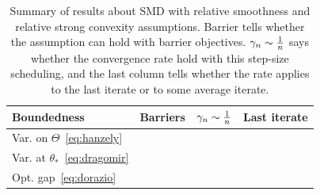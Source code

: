 \documentclass[twoside]{article}
\newcommand*{\expect}[2][]{\ensuremath{\mathbb{E}_{#1} \left[ #2 \right] }} %
\newcommand{\m}{\mu}
\newcommand{\lr}{\gamma} %
\begin{document}
\begin{table}[t]
\begingroup
\newcommand*{\greencmark}{\textcolor{Green}{\cmark}}
\newcommand*{\redxmark}{\textcolor{Red}{\xmark}}
\centering
\begin{tabular}{lccc}
\toprule
Boundedness & Barriers &  $\lr_n \sim \inv{n}$ & Last iterate \\
\midrule
Var. on $\Theta$~\eqref{eq:hanzely} %
& \redxmark & \greencmark  & \redxmark
\\
Var. at $\theta_*$~\eqref{eq:dragomir} %
& \redxmark & \greencmark  & \greencmark
\\
Opt. gap~\eqref{eq:dorazio} %
& \greencmark & \redxmark & \greencmark
\\
\bottomrule
\end{tabular}
\caption{
Summary of results about SMD with relative smoothness and relative strong convexity assumptions. 
Barrier tells whether the assumption can hold with barrier objectives.
$\lr_n \sim \inv{n}$ says whether the convergence rate hold with this step-size scheduling, and the last column tells whether the rate applies to the last iterate or to some average iterate.
}
\label{tbl:assumptions}
\endgroup
\end{table}
\end{document}
